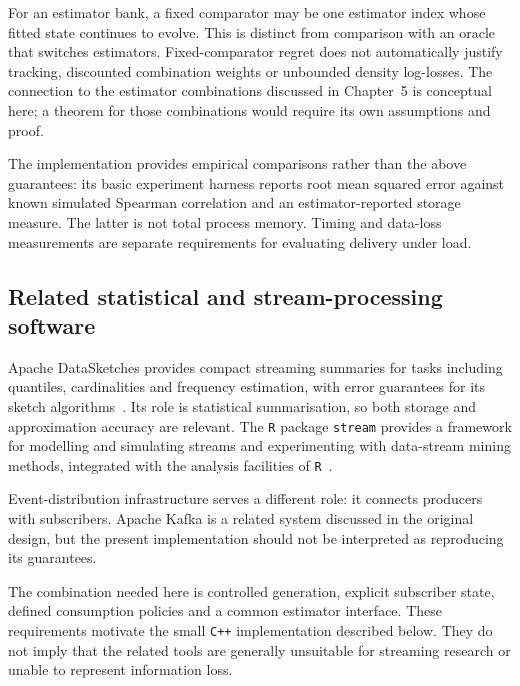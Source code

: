 For an estimator bank, a fixed comparator may be one estimator index whose fitted state continues to evolve. This is distinct from comparison with an oracle that switches estimators. Fixed-comparator regret does not automatically justify tracking, discounted combination weights or unbounded density log-losses. The connection to the estimator combinations discussed in Chapter~5 is conceptual here; a theorem for those combinations would require its own assumptions and proof.

The implementation provides empirical comparisons rather than the above guarantees: its basic experiment harness reports root mean squared error against known simulated Spearman correlation and an estimator-reported storage measure. The latter is not total process memory. Timing and data-loss measurements are separate requirements for evaluating delivery under load.

\subsection{Related statistical and stream-processing software}
\label{subsec:existing}
Apache DataSketches provides compact streaming summaries for tasks including quantiles, cardinalities and frequency estimation, with error guarantees for its sketch algorithms~\cite{apache_datasketches}. Its role is statistical summarisation, so both storage and approximation accuracy are relevant. The \texttt{R} package \texttt{stream} provides a framework for modelling and simulating streams and experimenting with data-stream mining methods, integrated with the analysis facilities of \texttt{R}~\cite{stream}.

Event-distribution infrastructure serves a different role: it connects producers with subscribers. Apache Kafka is a related system discussed in the original design, but the present implementation should not be interpreted as reproducing its guarantees.

The combination needed here is controlled generation, explicit subscriber state, defined consumption policies and a common estimator interface. These requirements motivate the small \texttt{C++} implementation described below. They do not imply that the related tools are generally unsuitable for streaming research or unable to represent information loss.

